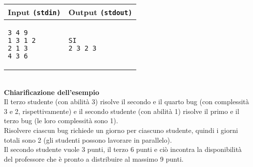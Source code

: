 \documentclass[a4paper,11pt]{article}
\begin{document}
  
    \noindent
    \begin{tabular}{p{8cm}|p{8cm}}
    \toprule
    \textbf{Input \texttt{(stdin)}}
    & \textbf{Output \texttt{(stdout)}}
    \\
    \midrule
    \small
    \begin{verbatim}
3 4 9
1 3 1 2
2 1 3
4 3 6

      \end{verbatim}
    &
    \small
    \begin{verbatim}
SI
2 3 2 3
      \end{verbatim}
    \\
    \bottomrule
    \end{tabular}
\\[12pt]
\textbf{Chiarificazione dell'esempio} \\
Il terzo studente (con abilità 3) risolve il secondo e il quarto bug (con complessità 3 e 2, rispettivamente) e il secondo studente (con abilità 1) risolve il primo e il terzo bug (le loro complessità sono 1). \\ Risolvere ciascun bug richiede un giorno per ciascuno studente, quindi i giorni totali sono 2 (gli studenti possono lavorare in parallelo).\\
Il secondo studente vuole 3 punti, il terzo 6 punti e ciò incontra la disponibilità del professore che è pronto a distribuire al massimo 9 punti.
\end{document}
